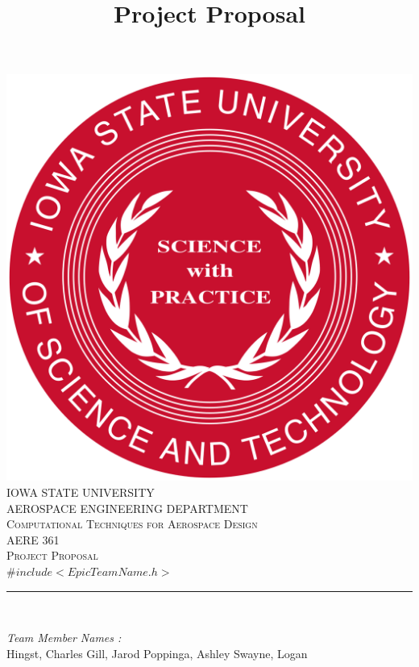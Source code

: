 \documentclass[12pt]{article}
\begin{document}
\title{Project Proposal}

\begin{titlepage}
	\centering
    \vspace*{0.5 cm}
    \includegraphics[scale = 0.11]{isu_seal.png}\\[1.0 cm]	%
    \textsc{\LARGE IOWA STATE UNIVERSITY}\\[2.0 cm]
    \textsc{\large AEROSPACE ENGINEERING DEPARTMENT}\\[0.2 cm]
    \textsc{\large Computational Techniques for Aerospace Design}\\[0.2 cm]
	\textsc{\Large AERE 361}\\[0.5 cm]				%
	\textsc{\Large Project Proposal}\\[0.2 cm]
	\textsc{\Large $\#include <EpicTeamName.h>$}\\[0.2 cm]
	\rule{\linewidth}{0.2 mm} \\[0.4 cm]
	
	
	\begin{minipage}{0.8\textwidth}
		
			\begin{flushleft} 
			\emph{Team Member Names :} \\
			Hingst, Charles\linebreak
			Gill, Jarod\linebreak
			Poppinga, Ashley\linebreak
			Swayne, Logan\linebreak
			
			
		\end{flushleft}
	\end{minipage}\\[2 cm]
	
	\vfill
	
\end{titlepage}
\end{document}

